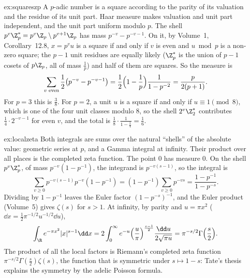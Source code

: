 \begin{solution}{ex:squareszp}
\idea A $p$-adic number is a square according to the parity of its valuation and the residue of its unit part. Haar measure makes valuation and unit part
independent, and the unit part uniform modulo $p$.
\writeup The shell $p^v\Z_p^*=p^v\Z_p\setminus p^{v+1}\Z_p$ has mass $p^{-v}-p^{-v-1}$. On it, by Volume~1, Corollary~12.8, $x=p^vu$ is a square if and only if $v$ is even and
$u\bmod p$ is a non-zero square; the $p-1$ unit residues are equally likely ($\Z_p^*$ is the union of $p-1$ cosets of $p\Z_p$, all of mass $\frac1p$) and half of them
are squares. So the measure is
\[\sum_{v\text{ even}}\frac12\bigl(p^{-v}-p^{-v-1}\bigr)=\frac12\Bigl(1-\frac1p\Bigr)\frac1{1-p^{-2}}=\frac p{2(p+1)}.\]
For $p=3$ this is $\frac38$. For $p=2$, a unit $u$ is a square if and only if $u\equiv1\pmod8$, which is one of the four unit classes modulo $8$, so the shell $2^v\Z_2^*$ contributes
$\frac14\cdot2^{-v-1}$ for even $v$, and the total is $\frac18\cdot\frac1{1-\frac14}=\frac16$.
\end{solution}

\begin{solution}{ex:localzeta}
\idea Both integrals are sums over the natural ``shells'' of the absolute value: geometric series at $p$, and a Gamma integral at infinity. Their
product over all places is the completed zeta function.
\writeup The point $0$ has measure $0$. On the shell $p^v\Z_p^*$, of mass $p^{-v}(1-p^{-1})$, the integrand is $p^{-v(s-1)}$, so the integral is
\[\sum_{v\ge0}p^{-v(s-1)}p^{-v}(1-p^{-1})=(1-p^{-1})\sum_{v\ge0}p^{-vs}=\frac{1-p^{-1}}{1-p^{-s}}.\]
Dividing by $1-p^{-1}$ leaves the Euler factor $(1-p^{-s})^{-1}$, and the Euler product (Volume~5) gives $\zeta(s)$ for $s>1$. At infinity, by parity and $u=\pi x^2$
($\dd x=\frac12\pi^{-1/2}u^{-1/2}\dd u$),
\[\int_\R e^{-\pi x^2}|x|^{s-1}\dd x=2\int_0^\infty e^{-u}\Bigl(\frac u\pi\Bigr)^{\frac{s-1}2}\frac{\dd u}{2\sqrt{\pi u}}=\pi^{-s/2}\Gamma\Bigl(\frac s2\Bigr).\]
The product of all the local factors is Riemann's completed zeta function $\pi^{-s/2}\Gamma(\frac s2)\zeta(s)$, the function that is symmetric under $s\mapsto1-s$: Tate's thesis
explains the symmetry by the adelic Poisson formula.
\end{solution}

